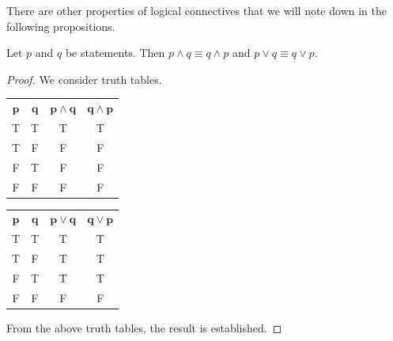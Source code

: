 There are other properties of logical connectives that we will note down in the following propositions.

\begin{proposition}
    Let $p$ and $q$ be statements. Then $p \land q \equiv q \land p$ and $p \lor q \equiv q \lor p$.
\end{proposition}
\begin{proof}
    We consider truth tables.
    \begin{table}[H]
        \centering
        \begin{minipage}{.45\linewidth}
            \centering
            \begin{tabular}{|c|c||c|c|}
                \hline
                $\boldsymbol{p}$ & $\boldsymbol{q}$ & $\boldsymbol{p \land q}$ & $\boldsymbol{q \land p}$ \\ \hhline{|=|=#=|=|}
                T & T & T & T \\ \hline
                T & F & F & F \\ \hline
                F & T & F & F \\ \hline
                F & F & F & F \\ \hline
            \end{tabular}
        \end{minipage}
        \begin{minipage}{.45\linewidth}
            \centering
            \begin{tabular}{|c|c||c|c|}
                \hline
                $\boldsymbol{p}$ & $\boldsymbol{q}$ & $\boldsymbol{p \lor q}$ & $\boldsymbol{q \lor p}$ \\ \hhline{|=|=#=|=|}
                T & T & T & T \\ \hline
                T & F & T & T \\ \hline
                F & T & T & T \\ \hline
                F & F & F & F \\ \hline
            \end{tabular}
        \end{minipage}
    \end{table}
    From the above truth tables, the result is established.
\end{proof}

